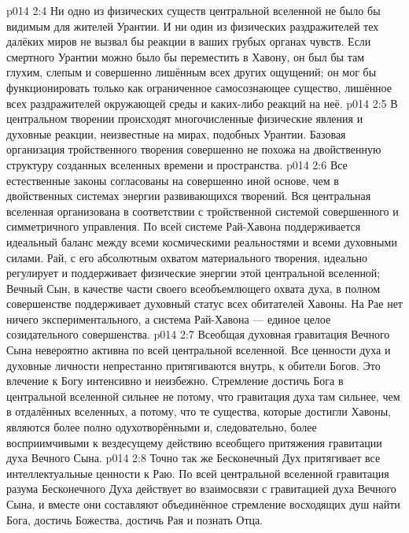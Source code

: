 \vs p014 2:4 Ни одно из физических существ центральной вселенной не было бы видимым для жителей Урантии. И ни один из физических раздражителей тех далёких миров не вызвал бы реакции в ваших грубых органах чувств. Если смертного Урантии можно было бы переместить в Хавону, он был бы там глухим, слепым и совершенно лишённым всех других ощущений; он мог бы функционировать только как ограниченное самосознающее существо, лишённое всех раздражителей окружающей среды и каких\hyp{}либо реакций на неё.
\vs p014 2:5 \pc В центральном творении происходят многочисленные физические явления и духовные реакции, неизвестные на мирах, подобных Урантии. Базовая организация тройственного творения совершенно не похожа на двойственную структуру созданных вселенных времени и пространства.
\vs p014 2:6 Все естественные законы согласованы на совершенно иной основе, чем в двойственных системах энергии развивающихся творений. Вся центральная вселенная организована в соответствии с тройственной системой совершенного и симметричного управления. По всей системе Рай\hyp{}Хавона поддерживается идеальный баланс между всеми космическими реальностями и всеми духовными силами. Рай, с его абсолютным охватом материального творения, идеально регулирует и поддерживает физические энергии этой центральной вселенной; Вечный Сын, в качестве части своего всеобъемлющего охвата духа, в полном совершенстве поддерживает духовный статус всех обитателей Хавоны. На Рае нет ничего экспериментального, а система Рай\hyp{}Хавона --- единое целое созидательного совершенства.
\vs p014 2:7 Всеобщая духовная гравитация Вечного Сына невероятно активна по всей центральной вселенной. Все ценности духа и духовные личности непрестанно притягиваются внутрь, к обители Богов. Это влечение к Богу интенсивно и неизбежно. Стремление достичь Бога в центральной вселенной сильнее не потому, что гравитация духа там сильнее, чем в отдалённых вселенных, а потому, что те существа, которые достигли Хавоны, являются более полно одухотворёнными и, следовательно, более восприимчивыми к вездесущему действию всеобщего притяжения гравитации духа Вечного Сына.
\vs p014 2:8 Точно так же Бесконечный Дух притягивает все интеллектуальные ценности к Раю. По всей центральной вселенной гравитация разума Бесконечного Духа действует во взаимосвязи с гравитацией духа Вечного Сына, и вместе они составляют объединённое стремление восходящих душ найти Бога, достичь Божества, достичь Рая и познать Отца.
